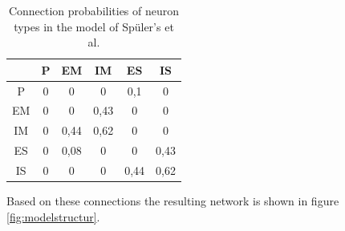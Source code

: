 \begin{table}[h]
	\centering
		\begin{tabular}{ |c|c|c|c|c|c|  }
			\hline
			   & P &  EM  & IM   & ES   & IS    \\ \hline
			P  & 0 &  0   & 0    & 0,1  & 0      \\
			EM & 0 &  0   & 0,43 & 0    & 0     \\
			IM & 0 & 0,44 & 0,62 & 0    & 0      \\
			ES & 0 & 0,08 & 0    & 0    & 0,43   \\
			IS & 0 &  0   & 0    & 0,44 &  0,62 \\ \hline
		\end{tabular}
	\caption[Spüler's et al. model's connection probabilities ]{Connection probabilities of neuron types in the model of Spüler's et al.}
	\label{table:SpuelerConnectionProbs}
\end{table}
%
Based on these connections the resulting network is shown in figure \ref{fig:modelstructur}.



